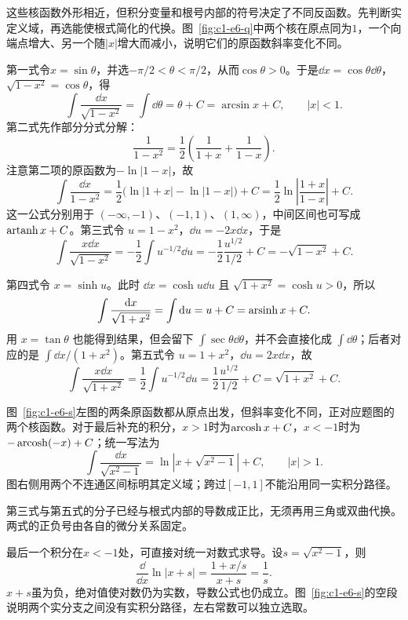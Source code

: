 \begin{solution}
这些核函数外形相近，但积分变量和根号内部的符号决定了不同反函数。先判断实定义域，再选能使根式简化的代换。图~\ref{fig:c1-e6-q}中两个核在原点同为$1$，一个向端点增大、另一个随$|x|$增大而减小，说明它们的原函数斜率变化不同。


第一式令$x=\sin\theta$，并选$-\pi/2<\theta<\pi/2$，从而$\cos\theta>0$。于是$\dd x=\cos\theta\dd\theta$，$\sqrt{1-x^2}=\cos\theta$，得
\[\int\frac{\dd x}{\sqrt{1-x^2}}=\int\dd\theta=\theta+C=\arcsin x+C,\qquad |x|<1.
\]
第二式先作部分分式分解：
\[\frac1{1-x^2}=\frac12\left(\frac1{1+x}+\frac1{1-x}\right).
\]
注意第二项的原函数为$-\ln|1-x|$，故
\[\int\frac{\dd x}{1-x^2}
=\frac12\bigl(\ln|1+x|-\ln|1-x|\bigr)+C
=\frac12\ln\left|\frac{1+x}{1-x}\right|+C.
\]
这一公式分别用于 $(-\infty,-1)$、$(-1,1)$、$(1,\infty)$，中间区间也可写成 $\operatorname{artanh} x+C$。第三式令 $u=1-x^2$，$\dd u=-2x\dd x$，于是
\[
\int\frac{x\dd x}{\sqrt{1-x^2}}=-\frac12\int u^{-1/2}\dd u
=-\frac12\frac{u^{1/2}}{1/2}+C=-\sqrt{1-x^2}+C.
\]

第四式令 $x=\sinh u$。此时 $\dd x=\cosh u\dd u$ 且 $\sqrt{1+x^2}=\cosh u>0$，所以
\[
\int\frac{\mathop{}\!\mathrm d x}{\sqrt{1+x^2}}=\int\mathop{}\!\mathrm d u=u+C=\operatorname{arsinh} x+C.
\]
用 $x=\tan\theta$ 也能得到结果，但会留下 $\int\sec\theta\dd\theta$，并不会直接化成 $\int\dd\theta$；后者对应的是 $\int\dd x/(1+x^2)$。第五式令 $u=1+x^2$，$\dd u=2x\dd x$，故
\[
\int\frac{x\dd x}{\sqrt{1+x^2}}=\frac12\int u^{-1/2}\dd u
=\frac12\frac{u^{1/2}}{1/2}+C=\sqrt{1+x^2}+C.
\]

图~\ref{fig:c1-e6-s}左图的两条原函数都从原点出发，但斜率变化不同，正对应题图的两个核函数。对于最后补充的积分，$x>1$时为$\operatorname{arcosh} x+C$，$x<-1$时为$-\operatorname{arcosh}(-x)+C$；统一写法为
\[\int\frac{\dd x}{\sqrt{x^2-1}}=\ln|x+\sqrt{x^2-1}|+C,\qquad |x|>1.
\]
图右侧用两个不连通区间标明其定义域；跨过$[-1,1]$不能沿用同一实积分路径。


第三式与第五式的分子已经与根式内部的导数成正比，无须再用三角或双曲代换。两式的正负号由各自的微分关系固定。

最后一个积分在$x<-1$处，可直接对统一对数式求导。设$s=\sqrt{x^2-1}$，则
\[\frac{\dd}{\dd x}\ln|x+s|=\frac{1+x/s}{x+s}=\frac1s.\]
$x+s$虽为负，绝对值使对数仍为实数，导数公式也仍成立。图~\ref{fig:c1-e6-s}的空段说明两个实分支之间没有实积分路径，左右常数可以独立选取。


\end{solution}
